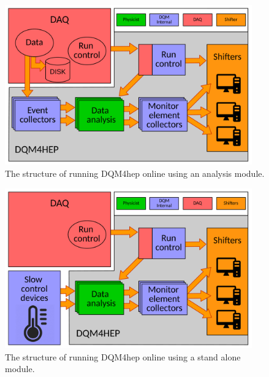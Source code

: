 \begin{figure}
	\centering
	\includegraphics[width=0.95\textwidth]{../Pictures/AnalysisModuleArchitecture.pdf}
	\caption{The structure of running DQM4hep online using an analysis module.}
	\label{figure:daq/dqm4hep/analysis-module}
\end{figure}

\begin{figure}
	\centering
	\includegraphics[width=0.95\textwidth]{../Pictures/StandaloneModuleArchitecture.pdf}
	\caption{The structure of running DQM4hep online using a stand alone module.}
	\label{figure:daq/dqm4hep/standalone-module}
\end{figure}

